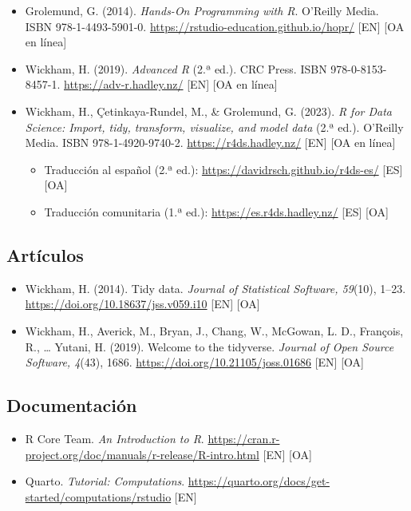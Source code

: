 \begin{itemize}
\tightlist
\item
  Grolemund, G. (2014). \emph{Hands-On Programming with R}. O'Reilly
  Media. ISBN 978-1-4493-5901-0.
  \url{https://rstudio-education.github.io/hopr/} {[}EN{]} {[}OA en
  línea{]}
\item
  Wickham, H. (2019). \emph{Advanced R} (2.ª ed.). CRC Press. ISBN
  978-0-8153-8457-1. \url{https://adv-r.hadley.nz/} {[}EN{]} {[}OA en
  línea{]}
\item
  Wickham, H., Çetinkaya-Rundel, M., \& Grolemund, G. (2023). \emph{R
  for Data Science: Import, tidy, transform, visualize, and model data}
  (2.ª ed.). O'Reilly Media. ISBN 978-1-4920-9740-2.
  \url{https://r4ds.hadley.nz/} {[}EN{]} {[}OA en línea{]}

  \begin{itemize}
  \tightlist
  \item
    Traducción al español (2.ª ed.):
    \url{https://davidrsch.github.io/r4ds-es/} {[}ES{]} {[}OA{]}
  \item
    Traducción comunitaria (1.ª ed.): \url{https://es.r4ds.hadley.nz/}
    {[}ES{]} {[}OA{]}
  \end{itemize}
\end{itemize}

\subsection*{Artículos}

\begin{itemize}
\tightlist
\item
  Wickham, H. (2014). Tidy data. \emph{Journal of Statistical Software,
  59}(10), 1--23. \url{https://doi.org/10.18637/jss.v059.i10} {[}EN{]}
  {[}OA{]}
\item
  Wickham, H., Averick, M., Bryan, J., Chang, W., McGowan, L. D.,
  François, R., \ldots{} Yutani, H. (2019). Welcome to the tidyverse.
  \emph{Journal of Open Source Software, 4}(43), 1686.
  \url{https://doi.org/10.21105/joss.01686} {[}EN{]} {[}OA{]}
\end{itemize}

\subsection*{Documentación}

\begin{itemize}
\tightlist
\item
  R Core Team. \emph{An Introduction to R}.
  \url{https://cran.r-project.org/doc/manuals/r-release/R-intro.html}
  {[}EN{]} {[}OA{]}
\item
  Quarto. \emph{Tutorial: Computations}.
  \url{https://quarto.org/docs/get-started/computations/rstudio}
  {[}EN{]}
\end{itemize}

